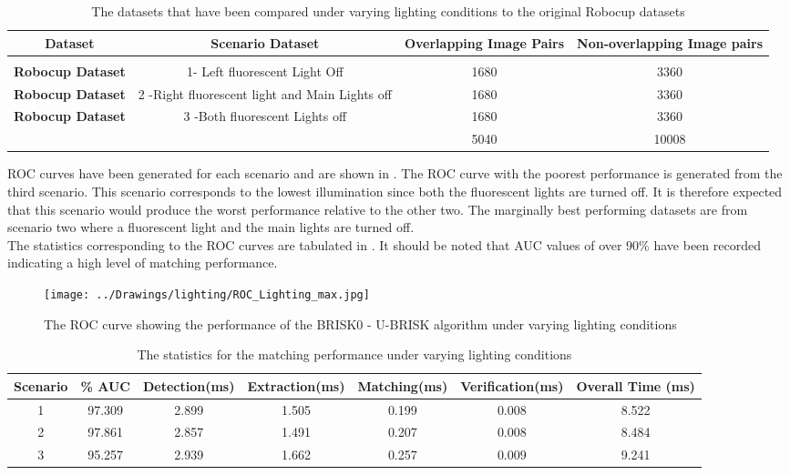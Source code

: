 \documentclass{report}
\begin{document}
\begin{table}
\caption{The datasets that have been compared under varying lighting conditions
to the original Robocup datasets}
\footnotesize
\begin{tabular}{|c|c|c|c|}
\hline 
\textbf{Dataset} & \textbf{Scenario Dataset} & \textbf{Overlapping Image Pairs} & \textbf{Non-overlapping Image pairs}\tabularnewline
\hline 
\hline 
 &  &  & \tabularnewline
\hline 
\textbf{Robocup Dataset} & 1- Left fluorescent Light Off & 1680 & 3360\tabularnewline
\hline 
\textbf{Robocup Dataset} & 2 -Right fluorescent light and Main Lights off & 1680 & 3360\tabularnewline
\hline 
\textbf{Robocup Dataset} & 3 -Both fluorescent Lights off & 1680 & 3360\tabularnewline
\hline 
 &  & 5040 & 10008\tabularnewline
\hline 
\end{tabular}

\label{tab:datasetLighting}
\end{table}

ROC curves have been generated for each scenario and are shown in . The ROC curve with the poorest performance is generated from the third scenario. This scenario corresponds to the lowest illumination since both the fluorescent lights are turned off. It is therefore expected that this scenario would produce the worst performance relative to the other two. The marginally best performing datasets are from scenario two where a fluorescent light and the main lights are turned off. \\

The statistics corresponding to the ROC curves are tabulated in . It should be noted that AUC values of over $90\%$ have been recorded indicating a high level of matching performance. \\


\begin{figure}[h!] 
  \centering
    \texttt{[image: ../Drawings/lighting/ROC\_Lighting\_max.jpg]}
    \caption{The ROC curve showing the performance of the BRISK0 - U-BRISK algorithm under varying lighting conditions}
    \label{fig:rocLighting}
\end{figure}

\begin{table}
\caption{The statistics for the matching performance under varying lighting conditions}
\begin{tabular}{|c|c|c|c|c|c|c|}
\hline 
Scenario & \% AUC & Detection(ms) & Extraction(ms) & Matching(ms) & Verification(ms) & Overall Time (ms)\tabularnewline
\hline 
\hline 
1 & 97.309 & 2.899 & 1.505 & 0.199 & 0.008 & 8.522\tabularnewline
\hline 
2 & 97.861 & 2.857 & 1.491 & 0.207 & 0.008 & 8.484\tabularnewline
\hline 
3 & 95.257 & 2.939 & 1.662 & 0.257 & 0.009 & 9.241\tabularnewline
\hline 
\end{tabular}
\label{tab:lightingStats}
\end{table}
\end{document}
